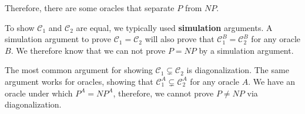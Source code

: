 Therefore, there are some oracles that separate $P$ from $NP$.

To show $\mathcal{C}_1$ and $\mathcal{C}_2$ are equal, we typically used \textbf{simulation} arguments.  A simulation argument to prove $\mathcal{C}_1 = \mathcal{C}_2$ will also prove that $\mathcal{C}_1^B=\mathcal{C}_2^B$ for any oracle $B$.  We therefore know that we can not prove $P=NP$ by a simulation argument.  

The most common argument for showing $\mathcal{C}_1 \subsetneq \mathcal{C}_2$ is diagonalization.  The same argument works for oracles, showing that $\mathcal{C}_1^A\subsetneq \mathcal{C}_2^A$ for any oracle $A$.  We have an oracle under which $P^A=NP^A$, therefore, we cannot prove $P\neq NP$ via diagonalization.
	
 


